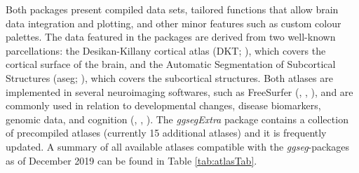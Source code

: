 \documentclass[fleqn,10pt]{wlpeerj} %
\begin{document}
Both packages present compiled data sets, tailored functions that allow brain data integration and plotting, and other minor features such as custom colour palettes.
The data featured in the packages are derived from two well-known parcellations: the Desikan-Killany cortical atlas (DKT; \citet{dkt}), which covers the cortical surface of the brain, and the Automatic Segmentation of Subcortical Structures (aseg; \citet{aseg}), which covers the subcortical structures.
Both atlases are implemented in several neuroimaging softwares, such as FreeSurfer (\citet{fischl_99}, \citet{dale_99}, \citet{Fischl2000}), and are commonly used in relation to developmental changes, disease biomarkers, genomic data, and cognition (\citet{amlien_elaboration_2019}, \citet{WALHOVD20051261}, \citet{Pizzagalli}).
The \emph{ggsegExtra} package contains a collection of precompiled atlases (currently 15 additional atlases) and it is frequently updated.
A summary of all available atlases compatible with the \emph{ggseg}-packages as of December 2019 can be found in Table \ref{tab:atlasTab}.
\end{document}
